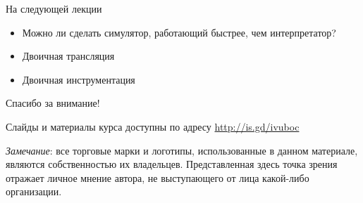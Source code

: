 \documentclass{beamer}
\begin{document}
\begin{frame}{На следующей лекции}
\begin{itemize}
\item Можно ли сделать симулятор, работающий 
быстрее, чем интерпретатор?
\item Двоичная трансляция
\item Двоичная инструментация
\end{itemize}
\end{frame}

\begin{frame}

{\huge{Спасибо за внимание!}\par}

\vfill

Слайды и материалы курса доступны по адресу \url{http://is.gd/ivuboc} %

\vfill

\tiny{\textit{Замечание}: все торговые марки и логотипы, использованные в данном материале, являются собственностью их владельцев. Представленная здесь точка зрения отражает личное мнение автора, не выступающего от лица какой-либо организации.}

\end{frame}
\end{document}
